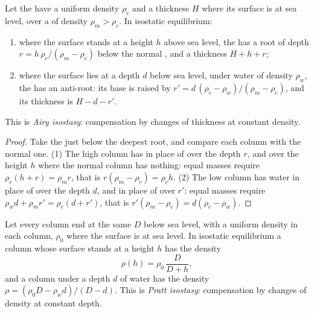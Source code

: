 \begin{proposition}\label{prop:b1:isostasy-gravity:airy}
Let the  have a uniform density $\rho_c$ and a thickness $H$ where its
surface is at sea level, over a  of density $\rho_m > \rho_c$. In isostatic
equilibrium:
\begin{enumerate}
  \item where the surface stands at a height $h$ above sea level, the  has
        a root of depth $r = h\,\rho_c/(\rho_m - \rho_c)$ below the normal ,
        and a thickness $H + h + r$;
  \item where the surface lies at a depth $d$ below sea level, under water of
        density $\rho_w$, the  has an anti-root: its base is raised by
        $r' = d\,(\rho_c - \rho_w)/(\rho_m - \rho_c)$, and its thickness is
        $H - d - r'$.
\end{enumerate}
This is \emph{Airy isostasy}: compensation by changes of
thickness at constant density.
\end{proposition}

\begin{proof}
Take the  just below the deepest root, and compare each
column with the normal one. (1) The high column has  in place of 
over the depth $r$, and  over the height $h$ where the normal column has
nothing: equal masses require $\rho_c(h + r) = \rho_m r$, that is
$r(\rho_m - \rho_c) = \rho_c h$. (2) The low column has water in place of 
over the depth $d$, and  in place of  over $r'$: equal masses require
$\rho_w d + \rho_m r' = \rho_c(d + r')$, that is $r'(\rho_m - \rho_c) =
d(\rho_c - \rho_w)$.
\end{proof}

\begin{proposition}\label{prop:b1:isostasy-gravity:pratt}
Let every column end at the same  $D$ below sea level, with a
uniform density in each column, $\rho_0$ where the surface is at sea level. In
isostatic equilibrium a column whose surface stands at a height $h$ has the
density
\[
  \rho(h) = \rho_0\,\frac{D}{D + h},
\]
and a column under a depth $d$ of water has the density
$\rho = (\rho_0 D - \rho_w d)/(D - d)$. This is \emph{Pratt
isostasy}: compensation by changes of density at constant
depth.
\end{proposition}

